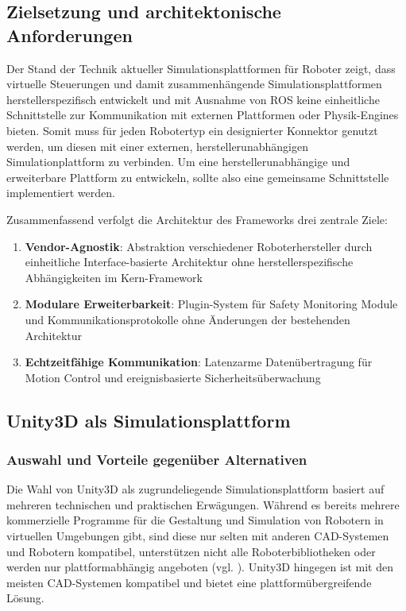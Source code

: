 \subsection{Zielsetzung und architektonische Anforderungen}
Der Stand der Technik aktueller Simulationsplattformen für Roboter zeigt, dass
virtuelle Steuerungen und damit zusammenhängende Simulationsplattformen
herstellerspezifisch entwickelt und mit Ausnahme von ROS keine einheitliche
Schnittstelle zur Kommunikation mit externen Plattformen oder Physik-Engines
bieten. Somit muss für jeden Robotertyp ein designierter Konnektor genutzt
werden, um diesen mit einer externen, herstellerunabhängigen Simulationplattform
zu verbinden. Um eine herstellerunabhängige und erweiterbare Plattform zu
entwickeln, sollte also eine gemeinsame Schnittstelle implementiert werden.

Zusammenfassend verfolgt die Architektur des Frameworks drei zentrale
Ziele:

\begin{enumerate}
	\item \textbf{Vendor-Agnostik}: Abstraktion verschiedener Roboterhersteller durch einheitliche Interface-basierte Architektur ohne herstellerspezifische Abhängigkeiten im Kern-Framework

	\item \textbf{Modulare Erweiterbarkeit}: Plugin-System für Safety Monitoring Module und Kommunikationsprotokolle ohne Änderungen der bestehenden Architektur

	\item \textbf{Echtzeitfähige Kommunikation}: Latenzarme Datenübertragung für Motion Control und ereignisbasierte Sicherheitsüberwachung
\end{enumerate}

\subsection{Unity3D als Simulationsplattform}

\subsubsection{Auswahl und Vorteile gegenüber Alternativen}

Die Wahl von Unity3D als zugrundeliegende Simulationsplattform basiert auf
mehreren technischen und praktischen Erwägungen. Während es bereits mehrere
kommerzielle Programme für die Gestaltung und Simulation von Robotern in
virtuellen Umgebungen gibt, sind diese nur selten mit anderen CAD-Systemen und
Robotern kompatibel, unterstützen nicht alle Roboterbibliotheken oder werden
nur plattformabhängig angeboten (vgl. ). Unity3D
hingegen ist mit den meisten CAD-Systemen kompatibel und bietet eine
plattformübergreifende Lösung.

